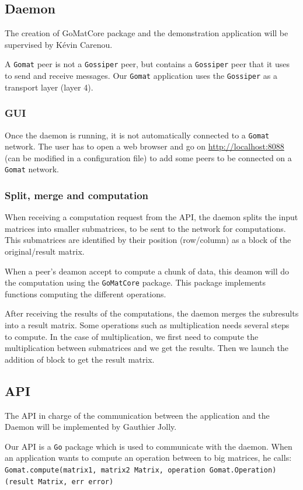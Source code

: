 \documentclass[a4paper,12pt]{article}
\newcommand{\Gossiper}{\texttt{Gossiper}\xspace}
\newcommand{\Gomat}{\texttt{Gomat}\xspace}
\newcommand{\Go}{\texttt{Go}\xspace}
\begin{document}
        \subsection{Daemon}
        The creation of GoMatCore package and the demonstration application will be supervised by Kévin Carenou.

        A \Gomat peer is not a \Gossiper peer, but contains a \Gossiper peer that it uses to send and receive messages. Our \Gomat application uses the \Gossiper as a transport layer (layer 4).

        \subsubsection{GUI}
        Once the daemon is running, it is not automatically connected to a \Gomat network. The user has to open a web browser and go on \url{http://localhost:8088} (can be modified in a configuration file) to add some peers to be connected on a
    \Gomat network.

    \subsubsection{Split, merge and computation}
    When receiving a computation request from the API, the daemon splits the input matrices into smaller submatrices, to be sent to the network for computations. This submatrices are identified by their position (row/column) as a block of the original/result matrix.

    When a peer's deamon accept to compute a chunk of data, this deamon will do the computation using the \texttt{GoMatCore} package. This package implements functions computing the different operations.

    After receiving the results of the computations, the daemon merges the subresults into a result matrix. Some operations such as multiplication needs several steps to compute. In the case of multiplication, we first need to compute the multiplication between submatrices and we get the results. Then we launch the addition of block to get the result matrix.

    \subsection{API}
    The API in charge of the communication between the application and the Daemon will be implemented by Gauthier Jolly.

    Our API is a \Go package which is used to communicate with the daemon. When an application wants to compute an operation between to big matrices, he calls:\\
    \texttt{Gomat.compute(matrix1, matrix2 Matrix, operation Gomat.Operation) (result Matrix, err error)}
\end{document}
